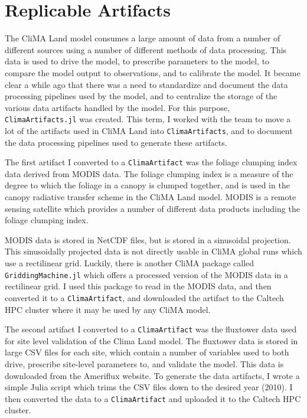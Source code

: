 \documentclass[11pt, a4paper]{article}
\begin{document}
\section{Replicable Artifacts}

The CliMA Land model consumes a large amount of data from a number of different
sources using a number of different methods of data processing. This data is
used to drive the model, to prescribe parameters to the model, to compare
the model output to observations, and to calibrate the model. It became clear
a while ago that there was a need to standardize and document the data
processing pipelines used by the model, and to centralize the storage of the
various data artifacts handled by the model. For this purpose,
\texttt{ClimaArtifacts.jl} was created. This term, I worked with the team to
move a lot of the artifacts used in CliMA Land into \texttt{ClimaArtifacts}, and
to document the data processing pipelines used to generate these artifacts.

The first artifact I converted to a \texttt{ClimaArtifact} was the foliage
clumping index data derived from MODIS data. The foliage clumping index is a
measure of the degree to which the foliage in a canopy is clumped together, and
is used in the canopy radiative transfer scheme in the CliMA Land model. MODIS 
is a remote sensing satellite which provides a number of different data products
including the foliage clumping index. 

MODIS data is stored in NetCDF files, but is stored in a sinusoidal projection.
This sinusoidally projected data is not directly usable in CliMA global runs 
which use a rectilinear grid. Luckily, there is another CliMA package called
\texttt{GriddingMachine.jl} which offers a processed version of the MODIS data
in a rectilinear grid. I used this package to read in the MODIS data, and then
converted it to a \texttt{ClimaArtifact}, and downloaded the artifact to the
Caltech HPC cluster where it may be used by any CliMA model. 

The second artifact I converted to a \texttt{ClimaArtifact} was the fluxtower
data used for site level validation of the Clima Land model. The fluxtower data
is stored in large CSV files for each site, which contain a number of variables
used to both drive, prescribe site-level parameters to, and validate the model.
This data is downloaded from the Ameriflux website. To generate the data
artifacts, I wrote a simple Julia script which trims the CSV files down to the
desired year (2010). I then converted the data to a \texttt{ClimaArtifact} and
uploaded it to the Caltech HPC cluster.
\end{document}
